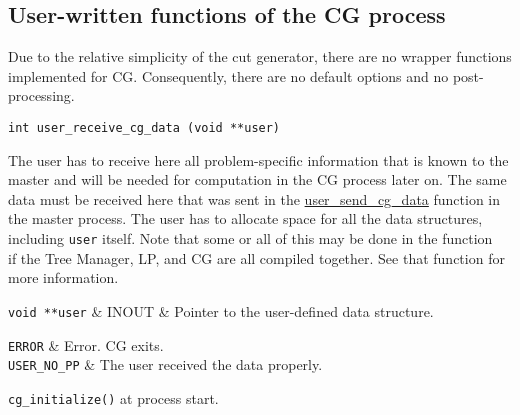\subsection{User-written functions of the CG process}

Due to the relative simplicity of the cut generator, there are no wrapper
functions implemented for CG. Consequently, there are no default
options and no post-processing.

\bd

\label{user_receive_cg_data}
\begin{verbatim}
int user_receive_cg_data (void **user)
\end{verbatim}

\bd

\describe

The user has to receive here all problem-specific information that is
known to the master and will be needed for computation in the CG
process later on. The same data must be received here that was sent in
the \hyperref{{\tt user\_send\_cg\_data()}}{{\tt
user\_send\_cg\_data()} (see Section }{)}{user_send_cg_data} function
in the master process. The user has to allocate space for all the data
structures, including {\tt user} itself. Note that some or all of this
may be done in the function {\tt 
{}} if the Tree Manager, LP,
and CG are all compiled together. See that function for more
information.

\args

{\tt void **user} & INOUT & Pointer to the user-defined data structure. \\
\et

\returns

{\tt ERROR} & Error. CG exits. \\
{\tt USER\_NO\_PP} & The user received the data properly. \\
\et

\item[Invoked from:] {\tt cg\_initialize()} at process start.

\ed

\vspace{1ex}

